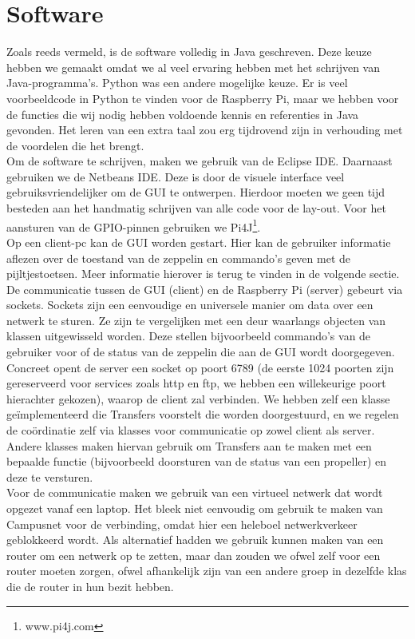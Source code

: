 \documentclass[eind]{penoverslag}
\begin{document}
\section{Software}
Zoals reeds vermeld, is de software volledig in Java geschreven. Deze keuze hebben we gemaakt omdat we al veel ervaring hebben met het schrijven van Java-programma's. Python was een andere mogelijke keuze. Er is veel voorbeeldcode in Python te vinden voor de Raspberry Pi, maar we hebben voor de functies die wij nodig hebben voldoende kennis en referenties in Java gevonden. Het leren van een extra taal zou erg tijdrovend zijn in verhouding met de voordelen die het brengt. \\

Om de software te schrijven, maken we gebruik van de Eclipse IDE. Daarnaast gebruiken we de Netbeans IDE. Deze is door de visuele interface veel gebruiksvriendelijker om de GUI te ontwerpen. Hierdoor moeten we geen tijd besteden aan het handmatig schrijven van alle code voor de lay-out. Voor het aansturen van de GPIO-pinnen gebruiken we Pi4J\footnote{www.pi4j.com}.\\

Op een client-pc kan de GUI worden gestart. Hier kan de gebruiker informatie aflezen over de toestand van de zeppelin en commando's geven met de pijltjestoetsen. Meer informatie hierover is terug te vinden in de volgende sectie. \\

De communicatie tussen de GUI (client) en de Raspberry Pi (server) gebeurt via sockets. Sockets zijn een eenvoudige en universele manier om data over een netwerk te sturen. Ze zijn te vergelijken met een deur waarlangs objecten van klassen uitgewisseld worden. Deze stellen bijvoorbeeld commando's van de gebruiker voor of de status van de zeppelin die aan de GUI wordt doorgegeven. Concreet opent de server een socket op poort 6789 (de eerste 1024 poorten zijn gereserveerd voor services zoals http en ftp, we hebben een willekeurige poort hierachter gekozen), waarop de client zal verbinden. We hebben zelf een klasse ge\"implementeerd die Transfers voorstelt die worden doorgestuurd, en we regelen de co\"ordinatie zelf via klasses voor communicatie op zowel client als server. Andere klasses maken hiervan gebruik om Transfers aan te maken met een bepaalde functie (bijvoorbeeld doorsturen van de status van een propeller) en deze te versturen. \\

Voor de communicatie maken we gebruik van een virtueel netwerk dat wordt opgezet vanaf een laptop. Het bleek niet eenvoudig om gebruik te maken van Campusnet voor de verbinding, omdat hier een heleboel netwerkverkeer geblokkeerd wordt. Als alternatief hadden we gebruik kunnen maken van een router om een netwerk op te zetten, maar dan zouden we ofwel zelf voor een router moeten zorgen, ofwel afhankelijk zijn van een andere groep in dezelfde klas die de router in hun bezit hebben. \\
\end{document}

